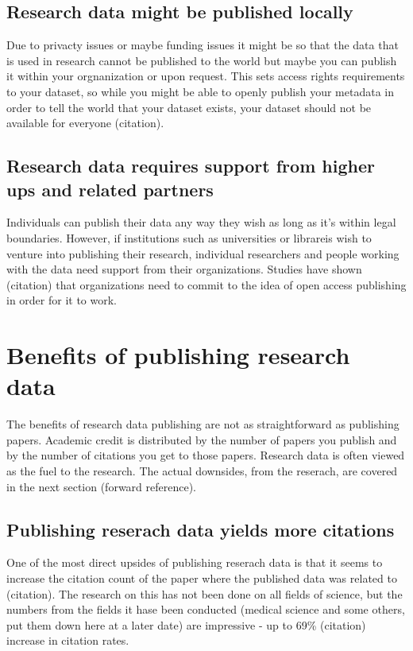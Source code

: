 \subsection{Research data might be published locally}

Due to privacty issues or maybe funding issues it might be so that the data
that is used in research cannot be published to the world but maybe you can
publish it within your orgnanization or upon request. This sets access rights
requirements to your dataset, so while you might be able to openly publish
your metadata in order to tell the world that your dataset exists, your dataset
should not be available for everyone (citation). 

\subsection{Research data requires support from higher ups and related partners}

Individuals can publish their data any way they wish as long as it's within
legal boundaries. However, if institutions such as universities or librareis
wish to venture into publishing their research, individual researchers and
people working with the data need support from their organizations. Studies
have shown (citation) that organizations need to commit to the idea of open
access publishing in order for it to work.

\section{Benefits of publishing research data}

The benefits of research data publishing are not as straightforward as
publishing papers. Academic credit is distributed by the number of papers you
publish and by the number of citations you get to those papers. Research data
is often viewed as the fuel to the research. The actual downsides, from the
reserach, are covered in the next section (forward reference).

\subsection{Publishing reserach data yields more citations}

One of the most direct upsides of publishing reserach data is that it seems to
increase the citation count of the paper where the published data was related
to (citation). The research on this has not been done on all fields of science,
but the numbers from the fields it hase been conducted (medical science and
some others, put them down here at a later date) are impressive - up to
69\% (citation) increase in citation rates.

